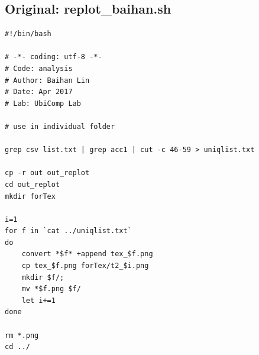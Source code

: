 \documentclass{sigchi}
\begin{document}
\subsection{Original: replot\_baihan.sh}\label{ss:replot}
\begin{lstlisting}
#!/bin/bash

# -*- coding: utf-8 -*-
# Code: analysis
# Author: Baihan Lin
# Date: Apr 2017
# Lab: UbiComp Lab

# use in individual folder

grep csv list.txt | grep acc1 | cut -c 46-59 > uniqlist.txt

cp -r out out_replot
cd out_replot
mkdir forTex

i=1
for f in `cat ../uniqlist.txt`
do
	convert *$f* +append tex_$f.png
	cp tex_$f.png forTex/t2_$i.png
	mkdir $f/;
	mv *$f.png $f/
	let i+=1
done

rm *.png
cd ../
\end{lstlisting}
\end{document}
